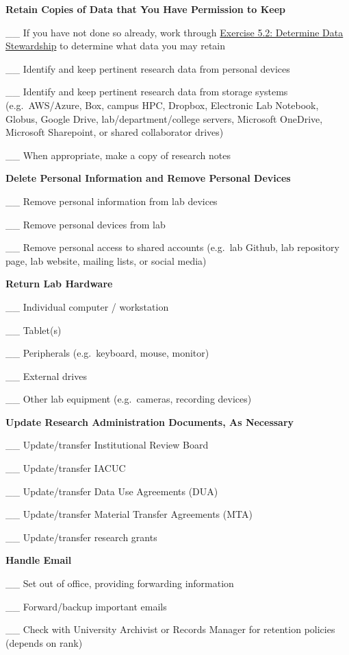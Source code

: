 \documentclass[
]{book}
\begin{document}
\textbf{Retain Copies of Data that You Have Permission to Keep}

\_\_ If you have not done so already, work through \protect\hyperlink{data-governance}{Exercise 5.2: Determine Data Stewardship} to determine what data you may retain

\_\_ Identify and keep pertinent research data from personal devices

\_\_ Identify and keep pertinent research data from storage systems (e.g.~AWS/Azure, Box, campus HPC, Dropbox, Electronic Lab Notebook, Globus, Google Drive, lab/department/college servers, Microsoft OneDrive, Microsoft Sharepoint, or shared collaborator drives)

\_\_ When appropriate, make a copy of research notes

\textbf{Delete Personal Information and Remove Personal Devices}

\_\_ Remove personal information from lab devices

\_\_ Remove personal devices from lab

\_\_ Remove personal access to shared accounts (e.g.~lab Github, lab repository page, lab website, mailing lists, or social media)

\textbf{Return Lab Hardware}

\_\_ Individual computer / workstation

\_\_ Tablet(s)

\_\_ Peripherals (e.g.~keyboard, mouse, monitor)

\_\_ External drives

\_\_ Other lab equipment (e.g.~cameras, recording devices)

\textbf{Update Research Administration Documents, As Necessary}

\_\_ Update/transfer Institutional Review Board

\_\_ Update/transfer IACUC

\_\_ Update/transfer Data Use Agreements (DUA)

\_\_ Update/transfer Material Transfer Agreements (MTA)

\_\_ Update/transfer research grants

\textbf{Handle Email}

\_\_ Set out of office, providing forwarding information

\_\_ Forward/backup important emails

\_\_ Check with University Archivist or Records Manager for retention policies (depends on rank)
\end{document}

